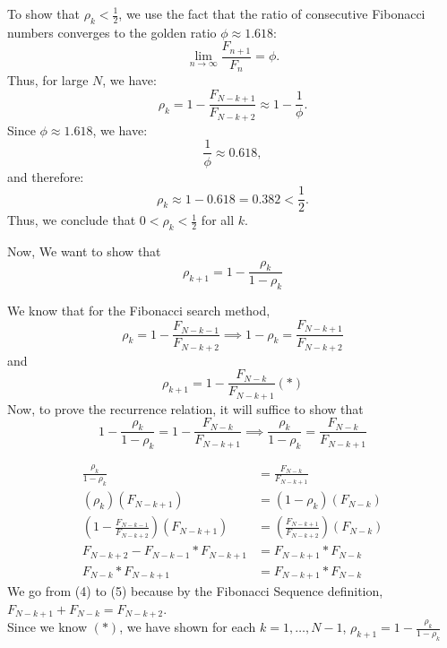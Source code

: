 \documentclass[12pt]{article}
\begin{document}
    To show that \( \rho_k < \frac{1}{2} \), we use the fact that the ratio of consecutive Fibonacci numbers converges to the golden ratio \( \phi \approx 1.618 \):
    \[
    \lim_{n \to \infty} \frac{F_{n+1}}{F_n} = \phi.
    \]
    Thus, for large \( N \), we have:
    \[
    \rho_k = 1 - \frac{F_{N-k+1}}{F_{N-k+2}} \approx 1 - \frac{1}{\phi}.
    \]
    Since \( \phi \approx 1.618 \), we have:
    \[
    \frac{1}{\phi} \approx 0.618,
    \]
    and therefore:
    \[
    \rho_k \approx 1 - 0.618 = 0.382 < \frac{1}{2}.
    \]
    Thus, we conclude that \( 0 < \rho_k < \frac{1}{2} \) for all \( k \).
    
\bigbreak
Now, We want to show that $$ \rho_{k+1} = 1 - \frac{\rho_k}{1 - \rho_k} $$

We know that for the Fibonacci search method, $$\rho_{k} = 1- \frac{F_{N-k-1}}{F_{N-k+2}} \implies 1-\rho_{k} = \frac{F_{N-k+1}}{F_{N-k+2}} $$
and $$\rho_{k+1} = 1- \frac{F_{N-k}}{F_{N-k+1}}    (*) $$ 
Now, to prove the recurrence relation, it will suffice to show that 
$$ 1 - \frac{\rho_k}{1 - \rho_k} = 1- \frac{F_{N-k}}{F_{N-k+1}} \implies \frac{\rho_k}{1 - \rho_k} = \frac{F_{N-k}}{F_{N-k+1}}$$

\begin{align}
    \frac{\rho_k}{1 - \rho_k} &= \frac{F_{N-k}}{F_{N-k+1}} \\
    (\rho_k)(F_{N-k+1}) &= (1 - \rho_k)(F_{N-k})  \\
    (1- \frac{F_{N-k-1}}{F_{N-k+2}})(F_{N-k+1}) &= (\frac{F_{N-k+1}}{F_{N-k+2}})(F_{N-k}) \\
    F_{N-k+2} - F_{N-k-1}*F_{N-k+1} &= F_{N-k+1}*F_{N-k}\\
    F_{N-k}*F_{N-k+1} &= F_{N-k+1}*F_{N-k}
\end{align}
We go from (4) to (5) because by the Fibonacci Sequence definition, $F_{N-k+1} + F_{N-k} = F_{N-k+2}$. \\
Since we know $(*)$, we have shown for each $k = 1, \dots, N - 1$, $\rho_{k+1} = 1 - \frac{\rho_k}{1 - \rho_k}$

\bigbreak
\end{document}
